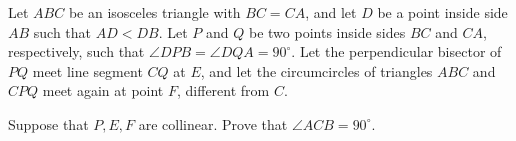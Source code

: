 Let $ABC$ be an isosceles triangle with $BC = CA$, and let $D$ be a point inside side $AB$ such that $AD < DB$. Let $P$ and $Q$ be two points inside sides $BC$ and $CA$, respectively, such that $\angle DPB = \angle DQA = 90^\circ$. Let the perpendicular bisector of $PQ$ meet line segment $CQ$ at $E$, and let the circumcircles of triangles $ABC$ and $CPQ$ meet again at point $F$, different from $C$.

Suppose that $P, E, F$ are collinear. Prove that $\angle ACB = 90^\circ$.
